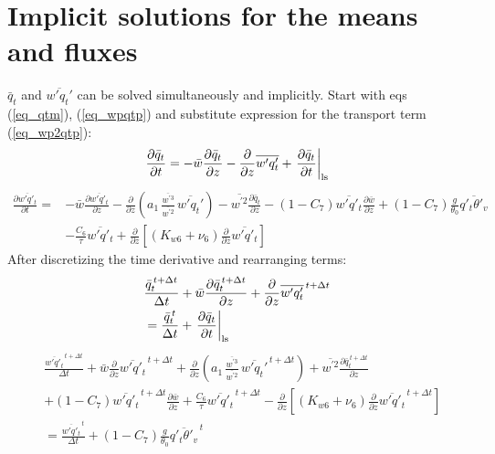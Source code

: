 \documentclass[11pt,fleqn]{article}
\newcommand{\ptlder}[2]{\frac{\partial #1}{\partial #2}}
\begin{document}
\section{Implicit solutions for the means and fluxes}

$\bar{q}_t$ and $\overline{w'q_t'}$ can be solved simultaneously and
implicitly.
Start with eqs (\ref{eq_qtm}), (\ref{eq_wpqtp}) and substitute expression
for the transport term (\ref{eq_wp2qtp}):
%
\begin{equation}
\ptlder{\bar{q}_t}{t}
= - \bar{w}\ptlder{\bar{q}_t}{z} 
  - \ptlder{}{z}\overline{w'q'_t} 
  + \left. \ptlder{\bar{q}_t}{t} \right|_{\rm ls}
\end{equation}
%
\begin{equation}
\begin{split}
\ptlder{\overline{w'q'_t}}{t} 
= & - \bar{w}\ptlder{\overline{w'q'_t}}{z}	 		
    - \ptlder{}{z}
      \left(   
               a_1 \,
               \frac{\overline{w^{'3}}}{\overline{w^{'2}}} \,
               \overline{w'q_t'}
      \right)
    - \overline{w^{'2}}\ptlder{\bar{q}_t}{z} 
    - (1-C_7) \overline{w'q'_t}\ptlder{\bar{w}}{z}
    + (1-C_7) \frac{g}{\theta_0} \overline{q'_t\theta'_v} \\
  & - \frac{C_6}{\tau}\overline{w'q'_t}
    + \ptlder{}{z} \left[ \left( K_{w6} + \nu_6 \right)
                          \ptlder{}{z} \overline{w'q'_t}
                   \right]
\end{split}
\end{equation}
%
After discretizing the time derivative and rearranging terms:
%
\begin{equation}
\label{eq_qxm2}
\begin{split}
& \frac{\bar{q}_t^{\, t+\Delta t}}{\Delta t}
  + \bar{w}\ptlder{\bar{q}_t^{\, t+\Delta t}}{z} 
  + \ptlder{}{z}\overline{w'q'_t}^{\, t+\Delta t} \\
& = \frac{\bar{q}_t^{\, t}}{\Delta t}
  + \left. \ptlder{\bar{q}_t}{t} \right|_{\rm ls}
\end{split}
\end{equation}
%
\begin{equation}
\label{eq_wpqxp2}
\begin{split}
& \frac{\overline{w'q'_t}^{\, t+\Delta t}}{\Delta t} 
  + \bar{w}\ptlder{}{z}\overline{w'q'_t}^{\, t+\Delta t}
  + \ptlder{}{z}
    \left(   
             a_1 \,
             \frac{\overline{w^{'3}}}{\overline{w^{'2}}} \,
             \overline{w'q_t'}^{\, t+\Delta t}
    \right)
  + \overline{w^{'2}}\ptlder{\bar{q}_t^{\, t+\Delta t}}{z} \\
& + (1-C_7) \overline{w'q'_t}^{\, t+\Delta t}\ptlder{\bar{w}}{z}
  + \frac{C_6}{\tau}\overline{w'q'_t}^{\, t+\Delta t}
  - \ptlder{}{z} \left[ \left( K_{w6} + \nu_6 \right)
                        \ptlder{}{z} \overline{w'q'_t}^{\, t+\Delta t}
                 \right]  \\
& = \frac{\overline{w'q'_t}^{\, t}}{\Delta t} 
    + (1-C_7) \frac{g}{\theta_0} \overline{q'_t\theta'_v}^{\, t}
\end{split}
\end{equation}
\end{document}
